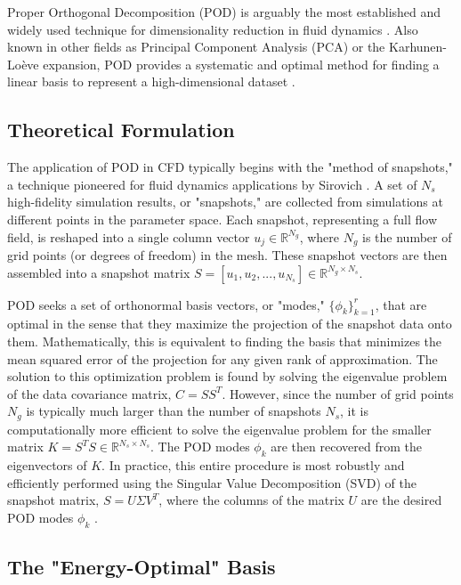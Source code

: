 \documentclass[dsc, EN]{ufabcFHZh}
\begin{document}
Proper Orthogonal Decomposition (POD) is arguably the most established and widely used technique for dimensionality reduction in fluid dynamics \citep{mifsud2016reduced, berkooz1993proper}. Also known in other fields as Principal Component Analysis (PCA) or the Karhunen-Loève expansion, POD provides a systematic and optimal method for finding a linear basis to represent a high-dimensional dataset \citep{cazemier1998proper}.

\subsection{Theoretical Formulation}

The application of POD in CFD typically begins with the "method of snapshots," a technique pioneered for fluid dynamics applications by Sirovich \citep{cazemier1998proper}. A set of $N_s$ high-fidelity simulation results, or "snapshots," are collected from simulations at different points in the parameter space. Each snapshot, representing a full flow field, is reshaped into a single column vector $u_j \in \mathbb{R}^{N_g}$, where $N_g$ is the number of grid points (or degrees of freedom) in the mesh. These snapshot vectors are then assembled into a snapshot matrix $S=[u_1, u_2,..., u_{N_s}] \in \mathbb{R}^{N_g \times N_s}$.

POD seeks a set of orthonormal basis vectors, or "modes," $\{\phi_k\}_{k=1}^r$, that are optimal in the sense that they maximize the projection of the snapshot data onto them. Mathematically, this is equivalent to finding the basis that minimizes the mean squared error of the projection for any given rank of approximation. The solution to this optimization problem is found by solving the eigenvalue problem of the data covariance matrix, $C=SS^T$. However, since the number of grid points $N_g$ is typically much larger than the number of snapshots $N_s$, it is computationally more efficient to solve the eigenvalue problem for the smaller matrix $K=S^TS \in \mathbb{R}^{N_s \times N_s}$. The POD modes $\phi_k$ are then recovered from the eigenvectors of $K$. In practice, this entire procedure is most robustly and efficiently performed using the Singular Value Decomposition (SVD) of the snapshot matrix, $S=U\Sigma V^T$, where the columns of the matrix $U$ are the desired POD modes $\phi_k$ \citep{steyert2022data}.

\subsection{The "Energy-Optimal" Basis}
\end{document}
